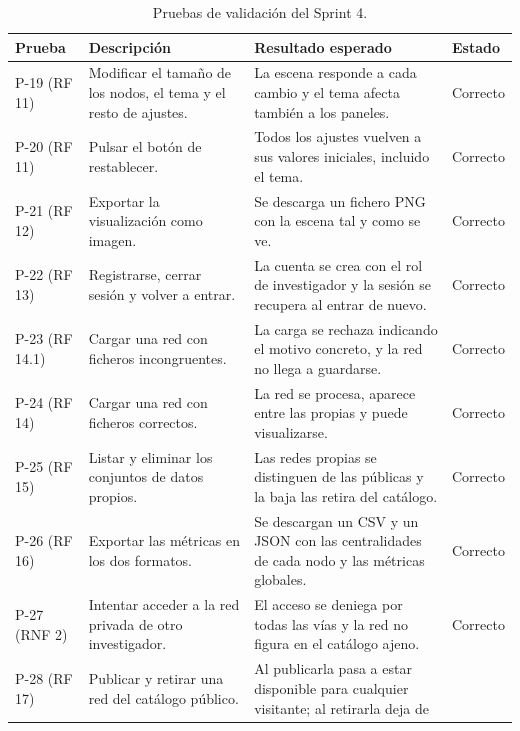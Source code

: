 \begin{table}[H]
	\centering
	\caption{Pruebas de validación del Sprint 4.}
	\label{tab:pruebas-s4}
	\small
	\begin{tabularx}{\textwidth}{>{\raggedright\arraybackslash}p{1.7cm} >{\raggedright\arraybackslash}X >{\raggedright\arraybackslash}X >{\centering\arraybackslash}p{1.6cm}}
		\toprule
		\textbf{Prueba} & \textbf{Descripción} & \textbf{Resultado esperado} & \textbf{Estado} \\
		\midrule
		P-19 (RF 11) & Modificar el tamaño de los nodos, el tema y el resto de ajustes. &
			La escena responde a cada cambio y el tema afecta también a los paneles. & Correcto \\
		\addlinespace
		P-20 (RF 11) & Pulsar el botón de restablecer. &
			Todos los ajustes vuelven a sus valores iniciales, incluido el tema. & Correcto \\
		\addlinespace
		P-21 (RF 12) & Exportar la visualización como imagen. &
			Se descarga un fichero PNG con la escena tal y como se ve. & Correcto \\
		\addlinespace
		P-22 (RF 13) & Registrarse, cerrar sesión y volver a entrar. &
			La cuenta se crea con el rol de investigador y la sesión se recupera al entrar de
			nuevo. & Correcto \\
		\addlinespace
		P-23 (RF 14.1) & Cargar una red con ficheros incongruentes. &
			La carga se rechaza indicando el motivo concreto, y la red no llega a guardarse. &
			Correcto \\
		\addlinespace
		P-24 (RF 14) & Cargar una red con ficheros correctos. &
			La red se procesa, aparece entre las propias y puede visualizarse. & Correcto \\
		\addlinespace
		P-25 (RF 15) & Listar y eliminar los conjuntos de datos propios. &
			Las redes propias se distinguen de las públicas y la baja las retira del catálogo. &
			Correcto \\
		\addlinespace
		P-26 (RF 16) & Exportar las métricas en los dos formatos. &
			Se descargan un CSV y un JSON con las centralidades de cada nodo y las métricas
			globales. & Correcto \\
		\addlinespace
		P-27 (RNF 2) & Intentar acceder a la red privada de otro investigador. &
			El acceso se deniega por todas las vías y la red no figura en el catálogo ajeno. &
			Correcto \\
		\addlinespace
		P-28 (RF 17) & Publicar y retirar una red del catálogo público. &
			Al publicarla pasa a estar disponible para cualquier visitante; al retirarla deja de

\end{tabularx}
\end{table}

